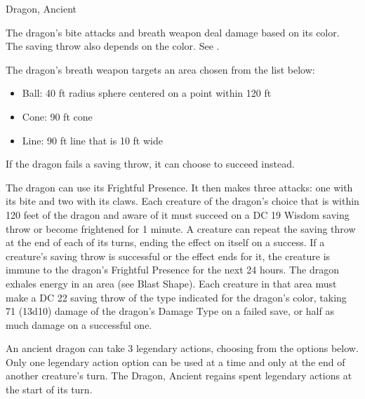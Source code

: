 \begin{DndMonster}[float*=b,width=\textwidth + 8pt]{Dragon, Ancient}
\begin{multicols}{2}
 The dragon's bite attacks and breath weapon deal damage based on its color. The saving throw also depends on the color. See .

 The dragon's breath weapon targets an area chosen from the list below:
\begin{itemize}
	\item[]Ball: 40 ft radius sphere centered on a point within 120 ft
	\item[]Cone: 90 ft cone
	\item[]Line: 90 ft line that is 10 ft wide
\end{itemize}

 If the dragon fails a saving throw, it can choose to succeed instead.

 The dragon can use its Frightful Presence. It then makes three attacks: one with its bite and two with its claws.
\DndMonsterAttack[
	name=Bite,
	distance=melee,
	type=weapon,
	mod=+15,
	reach=15,
	dmg=\DndDice{2d10 + 8},
	dmg-type=piercing,
	extra={ plus 9 (2d8) damage of the dragon's Damage Type.}
]
\DndMonsterAttack[
	name=Claw,
	distance=melee,
	type=weapon,
	mod=+15,
	reach=10,
	dmg=\DndDice{2d6 + 8},
	dmg-type=slashing
]
\DndMonsterAttack[
	name=Tail,
	distance=melee,
	type=weapon,
	mod=+15,
	reach=20,
	dmg=\DndDice{2d8 + 8},
	dmg-type=bludgeoning
]
Each creature of the dragon's choice that is within 120 feet of the dragon and aware of it must succeed on a DC 19 Wisdom saving throw or become frightened for 1 minute. A creature can repeat the saving throw at the end of each of its turns, ending the effect on itself on a success. If a creature's saving throw is successful or the effect ends for it, the creature is immune to the dragon's Frightful Presence for the next 24 hours.
The dragon exhales energy in an area (see Blast Shape). Each creature in that area must make a DC 22 saving throw of the type indicated for the dragon's color, taking 71 (13d10) damage of the dragon's Damage Type on a failed save, or half as much damage on a successful one.

An ancient dragon can take 3 legendary actions, choosing from the options below. Only one legendary action option can be used at a time and only at the end of another creature's turn. The Dragon, Ancient regains spent legendary actions at the start of its turn.
\begin{DndMonsterLegendaryActions}
\end{DndMonsterLegendaryActions}

\end{multicols}
\end{DndMonster}
